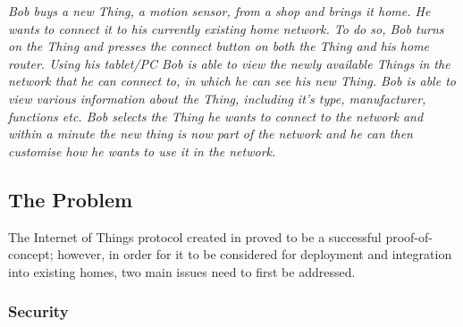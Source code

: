 \documentclass{mprop}
\begin{document}
\textit{Bob buys a new Thing, a motion sensor, from a shop and brings it home. He wants to connect it to his currently existing home network. To do so, Bob turns on the Thing and presses the connect button on both the Thing and his home router. Using his tablet/PC Bob is able to view the newly available Things in the network that he can connect to, in which he can see his new Thing. Bob is able to view various information about the Thing, including it's type, manufacturer, functions etc. Bob selects the Thing he wants to connect to the network and within a minute the new thing is now part of the network and he can then customise how he wants to use it in the network.}

\subsection{The Problem} %
\label{sub:the_problem}
The Internet of Things protocol created in \cite{KNoT} proved to be a successful proof-of-concept; however, in order for it to be considered for deployment and integration into existing homes, two main issues need to first be addressed.

\subsubsection{Security} %
\label{ssub:security}
\end{document}
